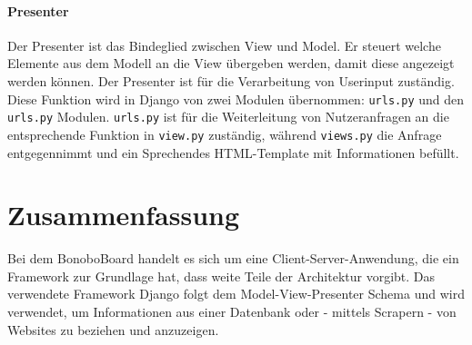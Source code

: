 \documentclass[a4paper,11pt]{scrartcl}
\begin{document}
\paragraph{Presenter}
Der Presenter ist das Bindeglied zwischen View und Model. Er steuert welche Elemente aus dem Modell an die View übergeben werden, damit diese angezeigt werden können. Der Presenter ist für die Verarbeitung von Userinput zuständig. Diese Funktion wird in Django von zwei Modulen übernommen: \texttt{urls.py} und den \texttt{urls.py} Modulen. \texttt{urls.py} ist für die Weiterleitung von Nutzeranfragen an die entsprechende Funktion in \texttt{view.py} zuständig, während \texttt{views.py} die Anfrage entgegennimmt und ein Sprechendes HTML-Template mit Informationen befüllt.


\section{Zusammenfassung}
Bei dem BonoboBoard handelt es sich um eine Client-Server-Anwendung, die ein Framework zur Grundlage hat, dass weite Teile der Architektur vorgibt. Das verwendete Framework Django folgt dem Model-View-Presenter Schema und wird verwendet, um Informationen aus einer Datenbank oder - mittels Scrapern - von Websites zu beziehen und anzuzeigen.


\end{document}
